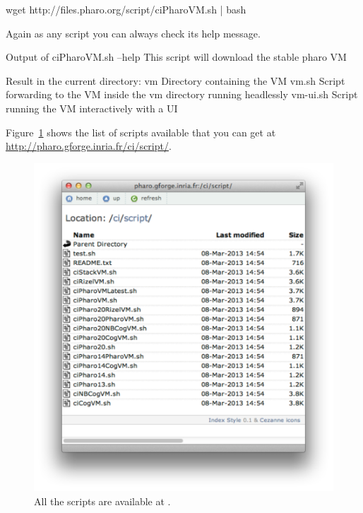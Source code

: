 \documentclass[a4paper,10pt,twoside]{book}
\begin{document}
\begin{code}{}
wget http://files.pharo.org/script/ciPharoVM.sh | bash
\end{code}

Again as any script you can always check its help message.

\begin{code}[]{Output of ciPharoVM.sh --help}
This script will download the stable pharo VM

Result in the current directory:
    vm            Directory containing the VM
    vm.sh            Script forwarding to the VM inside the vm directory running headlessly
    vm-ui.sh            Script running the VM interactively with a UI
\end{code}


Figure~\ref{fig:website} shows the list of scripts available that you can get at \url{http://pharo.gforge.inria.fr/ci/script/}.

\begin{figure}[!h]
	\centering
	\includegraphics[width=\textwidth]{webSite}
	\caption{All the scripts are available at  \label{fig:website}.}
\end{figure}
\end{document}
